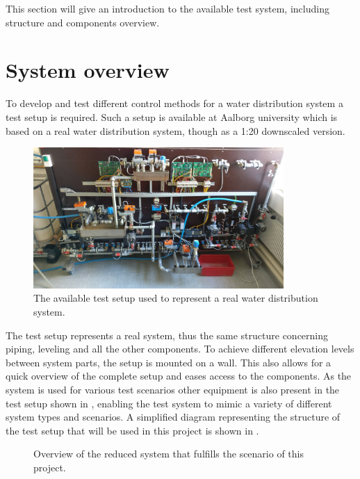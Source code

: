This section will give an introduction to the available test system, including structure and components overview.  

\section{System overview}
\label{system_overview}
To develop and test different control methods for a water distribution system a test setup is required.
Such a setup is available at Aalborg university which is based on a real water distribution system, though as a 1:20 downscaled version.

\begin{figure}[H]
\centering
\includegraphics[width=0.85\textwidth]{report/pictures/test_system_wide}
\caption{The available test setup used to represent a real water distribution system.}
\label{fig:test_setup}
\end{figure}


The test setup represents a real system, thus the same structure concerning piping, leveling and all the other components. To achieve different elevation levels between system parts, the setup is mounted on a wall. This also allows for a quick overview of the complete setup and eases access to the components. As the system is used for various test scenarios other equipment is also present in the test setup shown in , enabling the test system to mimic a variety of different system types and scenarios. A simplified diagram representing the structure of the test setup that will be used in this project is shown in . 

\begin{figure}[H]
\centering
 
\caption{Overview of the reduced system that fulfills the scenario of this project.}
\label{fig:sys_model_overview}
\end{figure}

